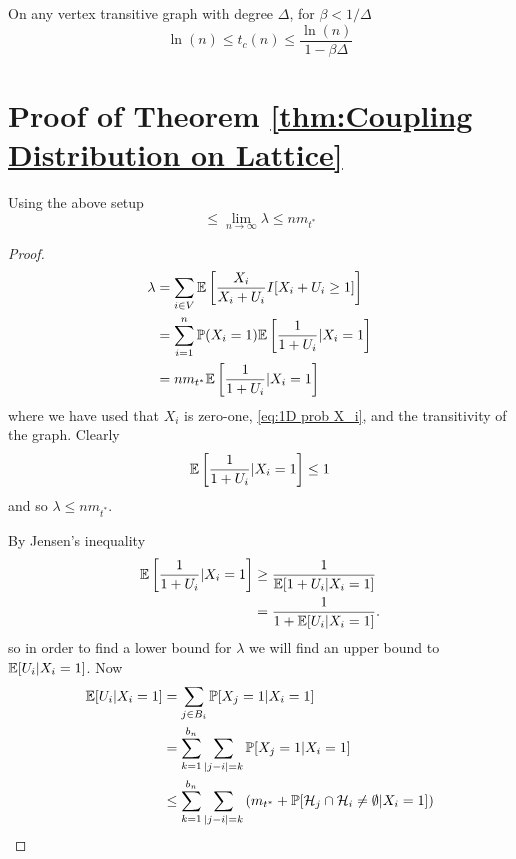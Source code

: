 \begin{corollary}
	On any vertex transitive graph with degree $\Delta$, for $\beta < 1/\Delta$
	\begin{equation}
		\ln(n) \leq t_c(n) \leq \frac{\ln(n)}{1 - \beta \Delta}
	\end{equation}
\end{corollary}

\section{Proof of Theorem \ref{thm:Coupling Distribution on Lattice}}
\begin{lemma}
\label{lem:nDlambda}
	Using the above setup
	\begin{equation}
		 \leq \lim_{n \rightarrow \infty} \lambda \leq n m_{t^*}
	\end{equation}
\end{lemma}
\begin{proof}
	\begin{align}
		\lambda &= \sum_{i \in V} \mathbb{E}\left[\frac{X_i}{X_i + U_i} I[ X_i + U_i \geq 1] \right]\\
			&= \sum_{i = 1}^n \mathbb{P}(X_i = 1) \mathbb{E} \left[\frac{1}{1 + U_i}| X_i = 1\right]\\
			&= n m_{t^*} \mathbb{E} \left[\frac{1}{1 + U_i}| X_i = 1\right]
	\end{align}
	where we have used that $X_i$ is zero-one, \eqref{eq:1D prob X_i}, and the transitivity of the graph.
	Clearly 
	\begin{align}
		\mathbb{E} \left[\frac{1}{1 + U_i}| X_i = 1\right] \leq 1
	\end{align}
	and so $\lambda \leq n m_{t^*}$.

	By Jensen's inequality
	\begin{align}
		\mathbb{E} \left[\frac{1}{1 + U_i}| X_i = 1\right] &\geq \frac{1}{\mathbb{E}[1 + U_i | X_i = 1]}\\
			&= \frac{1}{1 + \mathbb{E}[U_i | X_i = 1]}.
	\end{align}
	so in order to find a lower bound for $\lambda$ we will find an upper bound to $\mathbb{E}[U_i | X_i = 1]$. Now
	\begin{align}
		\mathbb{E}[U_i | X_i = 1] &= \sum_{j \in B_i} \mathbb{P}[X_j = 1| X_i = 1]\\
			&= \sum_{k=1}^{b_n} \sum_{|j - i| = k} \mathbb{P}[X_j = 1| X_i = 1]\\
			& \leq \sum_{k=1}^{b_n} \sum_{|j - i| = k} \left(m_{t^*} + \mathbb{P}[\mathcal{H}_{j} \cap \mathcal{H}_i \neq \emptyset | X_i = 1] \right)
	\end{align}
\end{proof}

